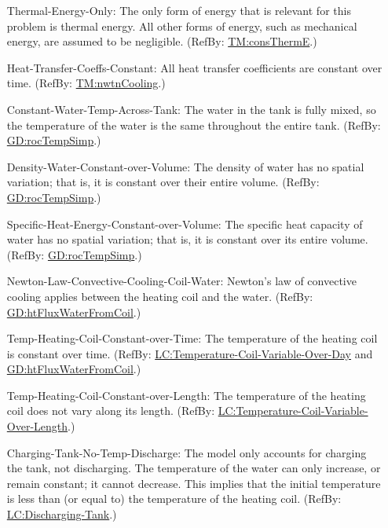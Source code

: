 \documentclass[12pt]{article}
\begin{document}
\begin{itemize}
\item[Thermal-Energy-Only:\phantomsection\label{assumpTEO}]{The only form of energy that is relevant for this problem is thermal energy. All other forms of energy, such as mechanical energy, are assumed to be negligible. (RefBy: \hyperref[TM:consThermE]{TM:consThermE}.)}
\item[Heat-Transfer-Coeffs-Constant:\phantomsection\label{assumpHTCC}]{All heat transfer coefficients are constant over time. (RefBy: \hyperref[TM:nwtnCooling]{TM:nwtnCooling}.)}
\item[Constant-Water-Temp-Across-Tank:\phantomsection\label{assumpCWTAT}]{The water in the tank is fully mixed, so the temperature of the water is the same throughout the entire tank. (RefBy: \hyperref[GD:rocTempSimp]{GD:rocTempSimp}.)}
\item[Density-Water-Constant-over-Volume:\phantomsection\label{assumpDWCoW}]{The density of water has no spatial variation; that is, it is constant over their entire volume. (RefBy: \hyperref[GD:rocTempSimp]{GD:rocTempSimp}.)}
\item[Specific-Heat-Energy-Constant-over-Volume:\phantomsection\label{assumpSHECoW}]{The specific heat capacity of water has no spatial variation; that is, it is constant over its entire volume. (RefBy: \hyperref[GD:rocTempSimp]{GD:rocTempSimp}.)}
\item[Newton-Law-Convective-Cooling-Coil-Water:\phantomsection\label{assumpLCCCW}]{Newton's law of convective cooling applies between the heating coil and the water. (RefBy: \hyperref[GD:htFluxWaterFromCoil]{GD:htFluxWaterFromCoil}.)}
\item[Temp-Heating-Coil-Constant-over-Time:\phantomsection\label{assumpTHCCoT}]{The temperature of the heating coil is constant over time. (RefBy: \hyperref[likeChgTCVOD]{LC:Temperature-Coil-Variable-Over-Day} and \hyperref[GD:htFluxWaterFromCoil]{GD:htFluxWaterFromCoil}.)}
\item[Temp-Heating-Coil-Constant-over-Length:\phantomsection\label{assumpTHCCoL}]{The temperature of the heating coil does not vary along its length. (RefBy: \hyperref[likeChgTCVOL]{LC:Temperature-Coil-Variable-Over-Length}.)}
\item[Charging-Tank-No-Temp-Discharge:\phantomsection\label{assumpCTNTD}]{The model only accounts for charging the tank, not discharging. The temperature of the water can only increase, or remain constant; it cannot decrease. This implies that the initial temperature is less than (or equal to) the temperature of the heating coil. (RefBy: \hyperref[likeChgDT]{LC:Discharging-Tank}.)}

\end{itemize}
\end{document}
